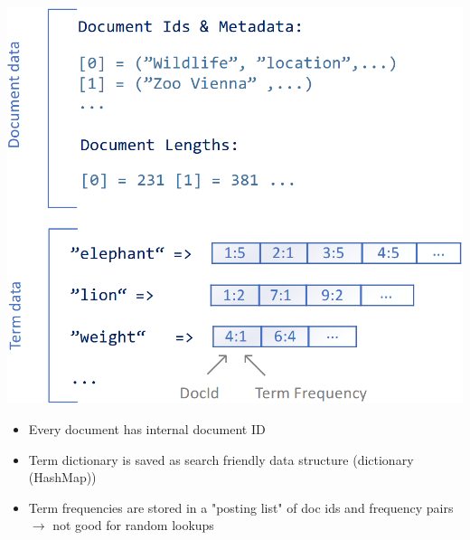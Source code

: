 \documentclass[
../../NLP4W_Summary.tex,
]
{subfiles}
\begin{document}
\begin{minipage}[t]
    {0.37\textwidth}
    \begin{defbox}
        \begin{center}
            \includegraphics[width=\textwidth]{Pics/InvertedIndexStructure.png}
        \end{center}

        \begin{itemize}
            \item Every document has internal document ID
            \item Term dictionary is saved as search friendly data structure (dictionary (HashMap))
            \item Term frequencies are stored in a "posting list" of doc ids and frequency pairs\\
            $\rightarrow$ not good for random lookups
        \end{itemize}
    \end{defbox}
\end{minipage}
\hfill
\end{document}
